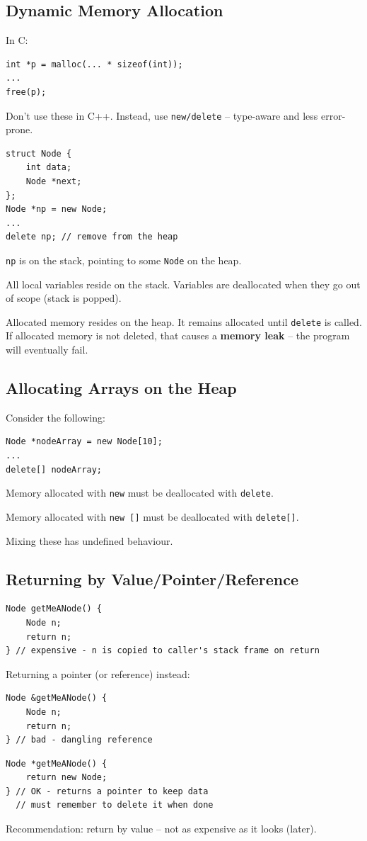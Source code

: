 \documentclass[11pt]{article}
\theoremstyle{definition}
\begin{document}
\subsection{Dynamic Memory Allocation}
In C:
\begin{lstlisting}
int *p = malloc(... * sizeof(int));
...
free(p);
\end{lstlisting}
Don't use these in C++. Instead, use {\tt new/delete} -- type-aware and less error-prone.
\begin{lstlisting}
struct Node {
    int data;
    Node *next;
};
Node *np = new Node;
...
delete np; // remove from the heap
\end{lstlisting}
{\tt *np} is on the stack, pointing to some {\tt Node} on the heap.

All local variables reside on the stack. Variables are deallocated when they go out of scope (stack is popped).

Allocated memory resides on the heap. It remains allocated until {\tt delete} is called. If allocated memory is not deleted, that causes a {\bf memory leak} -- the program will eventually fail.

\subsection{Allocating Arrays on the Heap}
Consider the following:
\begin{lstlisting}
Node *nodeArray = new Node[10];
...
delete[] nodeArray;
\end{lstlisting}
Memory allocated with {\tt new} must be deallocated with {\tt delete}. 

Memory allocated with {\tt new []} must be deallocated with {\tt delete[]}.

Mixing these has undefined behaviour.

\subsection{Returning by Value/Pointer/Reference}
\begin{lstlisting}
Node getMeANode() {
    Node n;
    return n;
} // expensive - n is copied to caller's stack frame on return
\end{lstlisting}
Returning a pointer (or reference) instead:
\begin{lstlisting}
Node &getMeANode() {
    Node n;
    return n;
} // bad - dangling reference
\end{lstlisting}
\begin{lstlisting}
Node *getMeANode() {
    return new Node;
} // OK - returns a pointer to keep data
  // must remember to delete it when done
\end{lstlisting}
Recommendation: return by value -- not as expensive as it looks (later).
\end{document}

